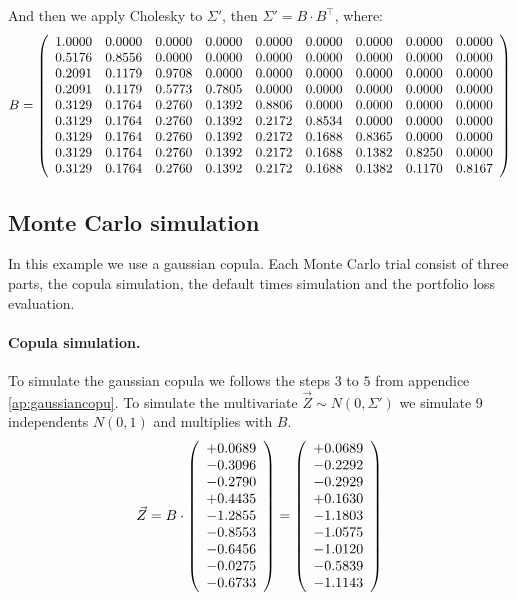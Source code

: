 \documentclass[a4paper,12pt,final]{article}
\begin{document}
And then we apply Cholesky to $\Sigma'$, then $\Sigma' = B \cdot B^{\top}$, 
where:
{\small
\begin{displaymath}
B = 
\left(
\begin{array}{ccccccccc}
   1.0000 & 0.0000 & 0.0000 & 0.0000 & 0.0000 & 0.0000 & 0.0000 & 0.0000 & 0.0000 \cr
   0.5176 & 0.8556 & 0.0000 & 0.0000 & 0.0000 & 0.0000 & 0.0000 & 0.0000 & 0.0000 \cr
   0.2091 & 0.1179 & 0.9708 & 0.0000 & 0.0000 & 0.0000 & 0.0000 & 0.0000 & 0.0000 \cr
   0.2091 & 0.1179 & 0.5773 & 0.7805 & 0.0000 & 0.0000 & 0.0000 & 0.0000 & 0.0000 \cr
   0.3129 & 0.1764 & 0.2760 & 0.1392 & 0.8806 & 0.0000 & 0.0000 & 0.0000 & 0.0000 \cr
   0.3129 & 0.1764 & 0.2760 & 0.1392 & 0.2172 & 0.8534 & 0.0000 & 0.0000 & 0.0000 \cr
   0.3129 & 0.1764 & 0.2760 & 0.1392 & 0.2172 & 0.1688 & 0.8365 & 0.0000 & 0.0000 \cr
   0.3129 & 0.1764 & 0.2760 & 0.1392 & 0.2172 & 0.1688 & 0.1382 & 0.8250 & 0.0000 \cr
   0.3129 & 0.1764 & 0.2760 & 0.1392 & 0.2172 & 0.1688 & 0.1382 & 0.1170 & 0.8167 \cr
\end{array}
\right)
\end{displaymath}
}

\subsection{Monte Carlo simulation}

In this example we use a gaussian copula. Each Monte Carlo trial consist of 
three parts, the copula simulation, the default times simulation and the
portfolio loss evaluation.

\paragraph{Copula simulation.} To simulate the gaussian copula we follows the 
steps $3$ to $5$ from appendice \ref{ap:gaussiancopu}. To simulate the multivariate
$\vec{Z} \sim N(0,\Sigma')$ we simulate 9 independents $N(0,1)$ and multiplies 
with $B$.
{\small
\begin{displaymath}
\vec{Z} = B \cdot
\left(
\begin{array}{c}
  +0.0689 \cr
  -0.3096 \cr
  -0.2790 \cr
  +0.4435 \cr
  -1.2855 \cr
  -0.8553 \cr
  -0.6456 \cr
  -0.0275 \cr
  -0.6733 \cr
\end{array}
\right) 
=
\left(
\begin{array}{c}
  +0.0689 \cr
  -0.2292 \cr
  -0.2929 \cr
  +0.1630 \cr
  -1.1803 \cr
  -1.0575 \cr
  -1.0120 \cr
  -0.5839 \cr
  -1.1143 \cr
\end{array}
\right) 
\end{displaymath}
}
\end{document}
